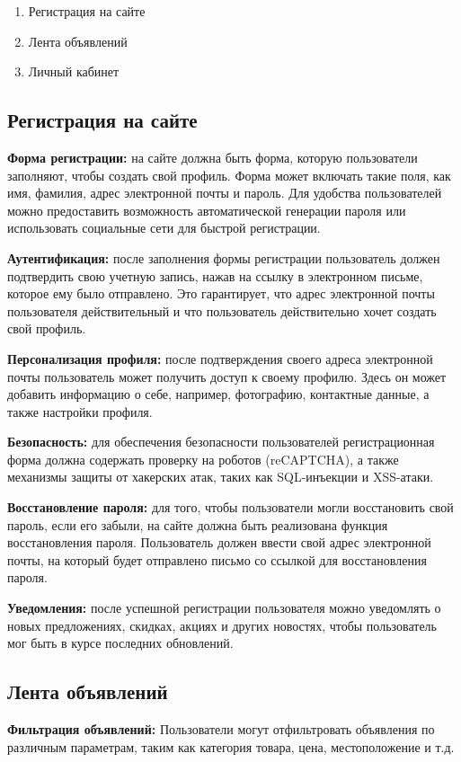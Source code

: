 \begin{enumerate}[wide, labelwidth=!, labelindent=0pt]
    \item Регистрация на сайте
    \item Лента объявлений
    \item Личный кабинет
\end{enumerate}




\subsection{Регистрация на сайте}
    \textbf{Форма регистрации:} на сайте должна быть форма, которую пользователи заполняют, чтобы создать свой профиль. Форма может включать такие поля, как имя, фамилия, адрес электронной почты и пароль. Для удобства пользователей можно предоставить возможность автоматической генерации пароля или использовать социальные сети для быстрой регистрации.

    \textbf{Аутентификация:} после заполнения формы регистрации пользователь должен подтвердить свою учетную запись, нажав на ссылку в электронном письме, которое ему было отправлено. Это гарантирует, что адрес электронной почты пользователя действительный и что пользователь действительно хочет создать свой профиль.

    \textbf{Персонализация профиля:} после подтверждения своего адреса электронной почты пользователь может получить доступ к своему профилю. Здесь он может добавить информацию о себе, например, фотографию, контактные данные, а также настройки профиля.

    \textbf{Безопасность:} для обеспечения безопасности пользователей регистрационная форма должна содержать проверку на роботов (reCAPTCHA), а также механизмы защиты от хакерских атак, таких как SQL-инъекции и XSS-атаки.

    \textbf{Восстановление пароля:} для того, чтобы пользователи могли восстановить свой пароль, если его забыли, на сайте должна быть реализована функция восстановления пароля. Пользователь должен ввести свой адрес электронной почты, на который будет отправлено письмо со ссылкой для восстановления пароля.

    \textbf{Уведомления:} после успешной регистрации пользователя можно уведомлять о новых предложениях, скидках, акциях и других новостях, чтобы пользователь мог быть в курсе последних обновлений.


\subsection{Лента объявлений}
    \textbf{Фильтрация объявлений:} Пользователи могут отфильтровать объявления по различным параметрам, таким как категория товара, цена, местоположение и т.д.

